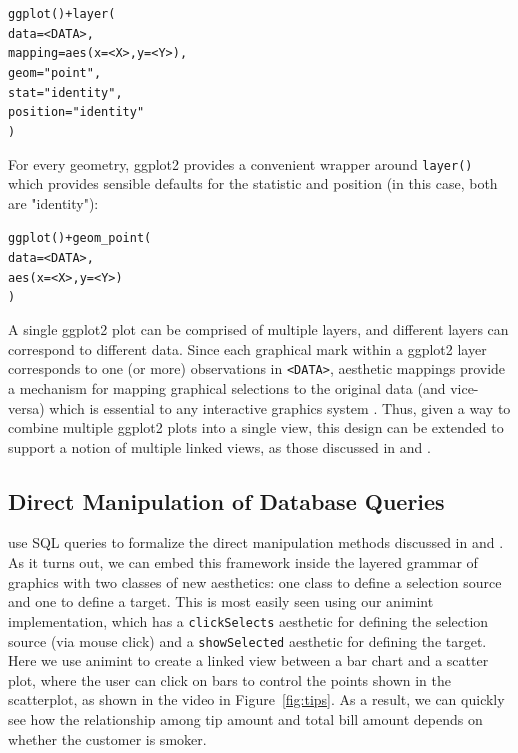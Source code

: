 \documentclass[12pt]{article}\usepackage[]{graphicx}\usepackage[]{color}
\makeatletter
\newcommand{\hlstr}[1]{\textcolor[rgb]{0.502,0,0}{#1}}%
\newcommand{\hlkwd}[1]{\textcolor[rgb]{0,0,0}{#1}}%
\newenvironment{kframe}{%
 \def\at@end@of@kframe{}%
 \ifinner\ifhmode%
  \def\at@end@of@kframe{\end{minipage}}%
  \begin{minipage}{\columnwidth}%
 \fi\fi%
 \def\FrameCommand##1{\hskip\@totalleftmargin \hskip-\fboxsep
 \colorbox{shadecolor}{##1}\hskip-\fboxsep
     \hskip-\linewidth \hskip-\@totalleftmargin \hskip\columnwidth}%
 \MakeFramed {\advance\hsize-\width
   \@totalleftmargin\z@ \linewidth\hsize
   \@setminipage}}%
 {\par\unskip\endMakeFramed%
 \at@end@of@kframe}
\newenvironment{knitrout}{}{} %
\makeatother
\begin{document}
\begin{knitrout}
\color{fgcolor}\begin{kframe}
\begin{alltt}
\hlkwd{ggplot}() + \hlkwd{layer}(
  data = <DATA>, 
  mapping = \hlkwd{aes}(x = <X>, y = <Y>), 
  geom = \hlstr{"point"}, 
  stat = \hlstr{"identity"},
  position = \hlstr{"identity"}
)
\end{alltt}
\end{kframe}
\end{knitrout}

For every geometry, ggplot2 provides a convenient wrapper around 
\texttt{layer()} which provides sensible defaults for the statistic and 
position (in this case, both are "identity"):

\begin{knitrout}
\color{fgcolor}\begin{kframe}
\begin{alltt}
\hlkwd{ggplot}() + \hlkwd{geom_point}(
  data = <DATA>, 
  \hlkwd{aes}(x = <X>, y = <Y>)
)
\end{alltt}
\end{kframe}
\end{knitrout}

A single ggplot2 plot can be comprised of multiple layers, and different layers 
can correspond to different data. Since each graphical mark within a ggplot2 
layer corresponds to one (or more) observations in \texttt{<DATA>}, aesthetic
mappings provide a mechanism for mapping graphical selections to the original 
data (and vice-versa) which is essential to any interactive graphics system
\citep{viewing-pipeline, plumbing}. Thus, given a way to combine multiple 
ggplot2 plots into a single view, this design can be extended to support a 
notion of multiple linked views, as those discussed in \citep{Ahlberg:1991} 
and \citep{Buja:1991vh}.

\subsection{Direct Manipulation of Database Queries}
\label{sec:extension}

\citet{ggobi:2007} use SQL queries to formalize the direct manipulation methods
discussed in \citet{Ahlberg:1991} and \citet{Buja:1991vh}. As it turns out, we 
can embed this framework inside the layered grammar of graphics with two classes
of new aesthetics: one class to define a selection source and one to define a
target. This is most easily seen using our animint implementation, which has a
\texttt{clickSelects} aesthetic for defining the selection source (via mouse 
click) and a \texttt{showSelected} aesthetic for defining the target. Here we 
use animint to create a linked view between a bar chart and a scatter plot, 
where the user can click on bars to control the points shown in the scatterplot,
as shown in the video in Figure~\ref{fig:tips}. As a result, we can quickly see
how the relationship among tip amount and total bill amount depends on whether 
the customer is smoker.
\end{document}

